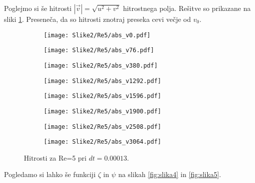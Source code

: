 \documentclass[12pt,a4paper]{article}
\begin{document}
\noindent Poglejmo si še hitrosti $|\vec{v}|=\sqrt{u^{2} + v^{2}}$ hitrostnega polja. Rešitve so prikazane na sliki \ref{fig:slika3}. Preseneča, da so hitrosti znotraj preseka cevi večje od $v_0$.

\begin{figure}[H]
    \centering
    \begin{subfigure}[b]{0.2\textwidth}  			
        \texttt{[image: Slike2/Re5/abs\_v0.pdf]}
    \end{subfigure}
    \begin{subfigure}[b]{0.2\textwidth}  			
        \texttt{[image: Slike2/Re5/abs\_v76.pdf]}
    \end{subfigure}
    \begin{subfigure}[b]{0.2\textwidth}  			
        \texttt{[image: Slike2/Re5/abs\_v380.pdf]}
    \end{subfigure}
        \begin{subfigure}[b]{0.2\textwidth}  			
        \texttt{[image: Slike2/Re5/abs\_v1292.pdf]}
    \end{subfigure}
 
     \begin{subfigure}[b]{0.2\textwidth}  			
        \texttt{[image: Slike2/Re5/abs\_v1596.pdf]}
    \end{subfigure}
        \begin{subfigure}[b]{0.2\textwidth}  			
        \texttt{[image: Slike2/Re5/abs\_v1900.pdf]}
    \end{subfigure}
        \begin{subfigure}[b]{0.2\textwidth}  			
        \texttt{[image: Slike2/Re5/abs\_v2508.pdf]}
    \end{subfigure}
        \begin{subfigure}[b]{0.2\textwidth}  			
        \texttt{[image: Slike2/Re5/abs\_v3064.pdf]}
    \end{subfigure}
    \caption{Hitrosti za Re=5 pri $dt=0.00013$.} \label{fig:slika3}
\end{figure}

\noindent Pogledamo si lahko še funkciji $\zeta$ in $\psi$ na slikah \ref{fig:slika4} in \ref{fig:slika5}.
\end{document}
